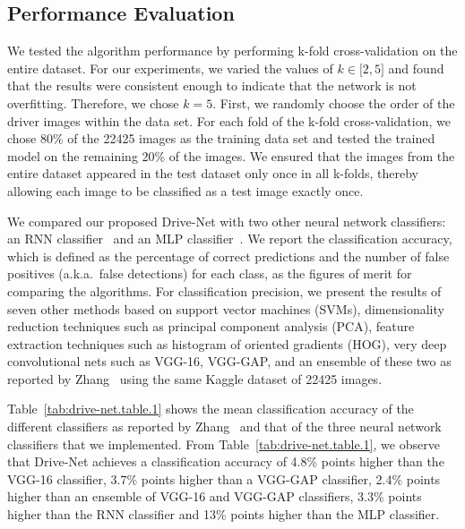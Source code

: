 \subsection{Performance Evaluation} We tested the algorithm performance by performing k-fold cross-validation on the entire dataset. For our experiments, we varied the values of $k\in\lbrack2, 5 \rbrack $ and found that the results were consistent enough to indicate that the network is not overfitting. Therefore, we chose $k = 5 $. First, we randomly choose the order of the driver images within the data set. For each fold of the k-fold cross-validation, we chose 80\% of the 22425 images as the training data set and tested the trained model on the remaining 20\% of the images. We ensured that the images from the entire dataset appeared in the test dataset only once in all k-folds, thereby allowing each image to be classified as a test image exactly once.

We compared our proposed Drive-Net with two other neural network classifiers: an RNN classifier~\cite{liang_Recurrent_2015} and an MLP classifier~\cite{haykin_Neural_2009}. We report the classification accuracy, which is defined as the percentage of correct predictions and the number of false positives (a.k.a.\ false detections) for each class, as the figures of merit for comparing the algorithms. For classification precision, we present the results of seven other methods based on support vector machines (SVMs), dimensionality reduction techniques such as principal component analysis (PCA), feature extraction techniques such as histogram of oriented gradients (HOG), very deep convolutional nets such as VGG-16, VGG-GAP, and an ensemble of these two as reported by Zhang~\cite{zhang_Apply_2016} using the same Kaggle dataset of 22425 images.

Table~\ref{tab:drive-net.table.1} shows the mean classification accuracy of the different classifiers as reported by Zhang~\cite{zhang_Apply_2016} and that of the three neural network classifiers that we implemented. From Table~\ref{tab:drive-net.table.1}, we observe that Drive-Net achieves a classification accuracy of 4.8\% points higher than the VGG-16 classifier, $3.7\% $ points higher than a VGG-GAP classifier, 2.4\% points higher than an ensemble of VGG-16 and VGG-GAP classifiers, 3.3\% points higher than the RNN classifier and 13\% points higher than the MLP classifier.

